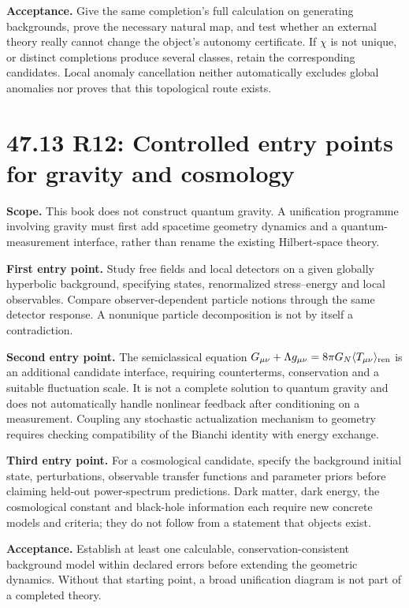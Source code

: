 \documentclass[
  11pt,
  oneside]{book}
\begin{document}
\textbf{Acceptance.} Give the same completion's full calculation on
generating backgrounds, prove the necessary natural map, and test
whether an external theory really cannot change the object's autonomy
certificate. If \(\chi\) is not unique, or distinct completions produce
several classes, retain the corresponding candidates. Local anomaly
cancellation neither automatically excludes global anomalies nor proves
that this topological route exists.

\section{47.13 R12: Controlled entry points for gravity and cosmology}

\textbf{Scope.} This book does not construct quantum gravity. A
unification programme involving gravity must first add spacetime
geometry dynamics and a quantum-measurement interface, rather than
rename the existing Hilbert-space theory.

\textbf{First entry point.} Study free fields and local detectors on a
given globally hyperbolic background, specifying states, renormalized
stress--energy and local observables. Compare observer-dependent
particle notions through the same detector response. A nonunique
particle decomposition is not by itself a contradiction.

\textbf{Second entry point.} The semiclassical equation
\(G_{\mu\nu}+\Lambda g_{\mu\nu}=8\pi G_N\langle T_{\mu\nu}\rangle_{\rm ren}\)
is an additional candidate interface, requiring counterterms,
conservation and a suitable fluctuation scale. It is not a complete
solution to quantum gravity and does not automatically handle nonlinear
feedback after conditioning on a measurement. Coupling any stochastic
actualization mechanism to geometry requires checking compatibility of
the Bianchi identity with energy exchange.

\textbf{Third entry point.} For a cosmological candidate, specify the
background initial state, perturbations, observable transfer functions
and parameter priors before claiming held-out power-spectrum
predictions. Dark matter, dark energy, the cosmological constant and
black-hole information each require new concrete models and criteria;
they do not follow from a statement that objects exist.

\textbf{Acceptance.} Establish at least one calculable,
conservation-consistent background model within declared errors before
extending the geometric dynamics. Without that starting point, a broad
unification diagram is not part of a completed theory.
\end{document}
